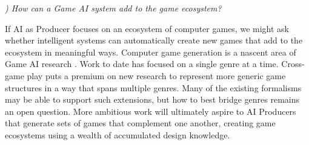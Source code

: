 \documentclass[conference]{IEEEtran}
\newcounter{questionno}
\newcommand{\subsubsectionx}[1]{{\em {\arabic{questionno}) #1}}
	\addtocounter{questionno}{1}
	}
\begin{document}
\subsubsectionx{How can a Game AI system add to the game ecosystem?}
%
If AI as Producer focuses on an ecosystem of computer games, we might ask whether intelligent systems can automatically create new games that add to the ecosystem in meaningful ways.
Computer game generation is a nascent area of Game AI research \cite{togelius2008:gamegen, smith2010:variations, cook2012:coopcoevo, hartsook2011:gameforge}. %
Work to date has focused on a single genre at a time. 
Cross-game play puts a premium on new research to represent more generic game structures in a way that spans multiple genres. 
Many of the existing formalisms may be able to support such extensions, but how to best bridge genres remains an open question.
More ambitious work will ultimately aspire to AI Producers that generate sets of games that complement one another, creating game ecosystems using a wealth of accumulated design knowledge.

\end{document}
